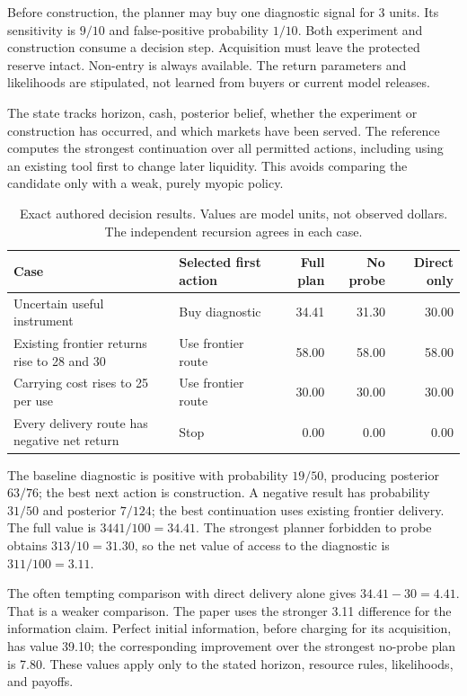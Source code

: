 \documentclass[11pt,letterpaper]{article}
\theoremstyle{remark}\newtheorem{remark}{Remark}[section]
\begin{document}
Before construction, the planner may buy one diagnostic signal for 3 units. Its sensitivity is $9/10$ and false-positive probability $1/10$. Both experiment and construction consume a decision step. Acquisition must leave the protected reserve intact. Non-entry is always available. The return parameters and likelihoods are stipulated, not learned from buyers or current model releases.

The state tracks horizon, cash, posterior belief, whether the experiment or construction has occurred, and which markets have been served. The reference computes the strongest continuation over all permitted actions, including using an existing tool first to change later liquidity. This avoids comparing the candidate only with a weak, purely myopic policy.

\begin{table}[H]
\caption{Exact authored decision results. Values are model units, not observed dollars. The independent recursion agrees in each case.}\label{tab:decision}
\small
\begin{tabularx}{\linewidth}{Y P{2.7cm} r r r}
\toprule
\textbf{Case}&\textbf{Selected first action}&\textbf{Full plan}&\textbf{No probe}&\textbf{Direct only}\\
\midrule
Uncertain useful instrument & Buy diagnostic & 34.41 & 31.30 & 30.00\\
Existing frontier returns rise to 28 and 30 & Use frontier route & 58.00 & 58.00 & 58.00\\
Carrying cost rises to 25 per use & Use frontier route & 30.00 & 30.00 & 30.00\\
Every delivery route has negative net return & Stop & 0.00 & 0.00 & 0.00\\
\bottomrule
\end{tabularx}
\end{table}

The baseline diagnostic is positive with probability $19/50$, producing posterior $63/76$; the best next action is construction. A negative result has probability $31/50$ and posterior $7/124$; the best continuation uses existing frontier delivery. The full value is $3441/100=34.41$. The strongest planner forbidden to probe obtains $313/10=31.30$, so the net value of access to the diagnostic is $311/100=3.11$.

The often tempting comparison with direct delivery alone gives $34.41-30=4.41$. That is a weaker comparison. The paper uses the stronger 3.11 difference for the information claim. Perfect initial information, before charging for its acquisition, has value 39.10; the corresponding improvement over the strongest no-probe plan is 7.80. These values apply only to the stated horizon, resource rules, likelihoods, and payoffs.
\end{document}
